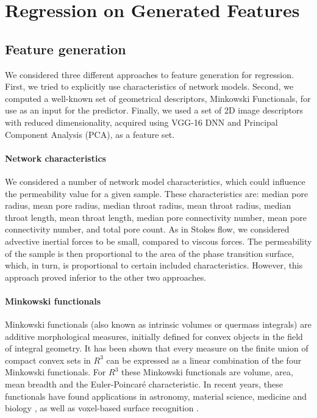\documentclass[review]{elsarticle}
\begin{document}
\section{Regression on Generated Features}

\subsection{Feature generation}

We considered three different approaches to feature generation for regression. First, we tried to explicitly use characteristics of network models. Second, we computed a well-known set of geometrical descriptors, Minkowski Functionals, for use as an input for the predictor. Finally, we used a set of 2D image descriptors with reduced dimensionality, acquired using VGG-16 DNN and Principal Component Analysis (PCA), as a feature set.

\paragraph{Network characteristics}

We considered a number of network model characteristics, which could influence the permeability value for a given sample. These characteristics are: median pore radius, mean pore radius, median throat radius, mean throat radius, median throat length, mean throat length, median pore connectivity number, mean pore connectivity number, and total pore count.
As in Stokes flow, we considered advective inertial forces to be small, compared to viscous forces. The permeability of the sample is then proportional to the area of the phase transition surface, which, in turn, is proportional to certain included characteristics.
However, this approach proved inferior to the other two approaches.

\paragraph{Minkowski functionals}

Minkowski functionals (also known as intrinsic volumes or quermass integrals) are additive morphological measures, initially defined for convex objects in the field of integral geometry. It has been shown that every measure on the finite union of compact convex sets in $R^3$ can be expressed as a linear combination of the four Minkowski functionals. For $R^3$ these Minkowski functionals are volume, area, mean breadth and the Euler-Poincaré characteristic. In recent years, these functionals have found applications in astronomy, material science, medicine and biology \cite{blasquez2003efficient,guderlei2007algorithms,berchtold2007modelling,vogel2010quantification}, as well as voxel-based surface recognition \cite{yarotsky2017geometric}.
\end{document}
